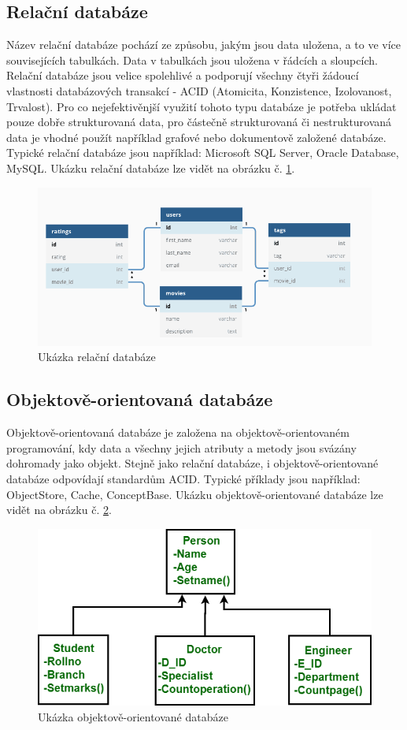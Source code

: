 \subsection{Relační databáze}
Název relační databáze pochází ze způsobu, jakým jsou data uložena, a to ve více souvisejících tabulkách. Data v tabulkách jsou uložena v řádcích a sloupcích. Relační databáze jsou velice spolehlivé a podporují všechny čtyři žádoucí vlastnosti databázových transakcí - ACID (Atomicita, Konzistence, Izolovanost, Trvalost). Pro co nejefektivěnjší využití tohoto typu databáze je potřeba ukládat pouze dobře strukturovaná data, pro částečně strukturovaná či nestrukturovaná data je vhodné použít například grafové nebo dokumentově založené databáze. Typické relační databáze jsou například: Microsoft SQL Server, Oracle Database, MySQL. Ukázku relační databáze lze vidět na obrázku č. \ref{fig:db_img_relational}.
	\begin{figure}[H]
	\centering
	\includegraphics[width=14cm]{img/databaze/relational_db}
	\caption{Ukázka relační databáze}
	\label{fig:db_img_relational}
	\end{figure}
\subsection{Objektově-orientovaná databáze}
Objektově-orientovaná databáze je založena na objektově-orientovaném programování, kdy data a všechny jejich atributy a metody jsou svázány dohromady jako objekt. Stejně jako relační databáze, i objektově-orientované databáze odpovídají standardům ACID. Typické příklady jsou například: ObjectStore, Cache, ConceptBase. Ukázku objektově-orientované databáze lze vidět na obrázku č. \ref{fig:db_img_oo}.
	\begin{figure}[H]
	\centering
	\includegraphics[width=12cm]{img/databaze/oo_db}
	\caption{Ukázka objektově-orientované databáze}
	\label{fig:db_img_oo}
	\end{figure}
